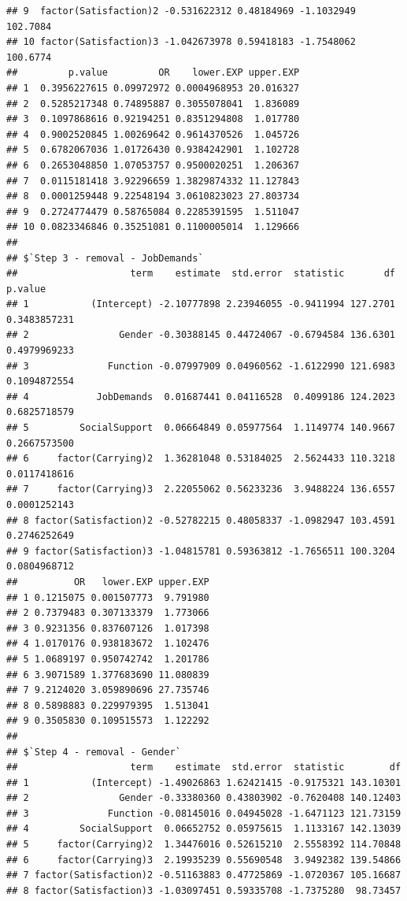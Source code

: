 \documentclass[
]{book}
\begin{document}
\begin{verbatim}
## 9  factor(Satisfaction)2 -0.531622312 0.48184969 -1.1032949 102.7084
## 10 factor(Satisfaction)3 -1.042673978 0.59418183 -1.7548062 100.6774
##         p.value         OR    lower.EXP upper.EXP
## 1  0.3956227615 0.09972972 0.0004968953 20.016327
## 2  0.5285217348 0.74895887 0.3055078041  1.836089
## 3  0.1097868616 0.92194251 0.8351294808  1.017780
## 4  0.9002520845 1.00269642 0.9614370526  1.045726
## 5  0.6782067036 1.01726430 0.9384242901  1.102728
## 6  0.2653048850 1.07053757 0.9500020251  1.206367
## 7  0.0115181418 3.92296659 1.3829874332 11.127843
## 8  0.0001259448 9.22548194 3.0610823023 27.803734
## 9  0.2724774479 0.58765084 0.2285391595  1.511047
## 10 0.0823346846 0.35251081 0.1100005014  1.129666
## 
## $`Step 3 - removal - JobDemands`
##                    term    estimate  std.error  statistic       df      p.value
## 1           (Intercept) -2.10777898 2.23946055 -0.9411994 127.2701 0.3483857231
## 2                Gender -0.30388145 0.44724067 -0.6794584 136.6301 0.4979969233
## 3              Function -0.07997909 0.04960562 -1.6122990 121.6983 0.1094872554
## 4            JobDemands  0.01687441 0.04116528  0.4099186 124.2023 0.6825718579
## 5         SocialSupport  0.06664849 0.05977564  1.1149774 140.9667 0.2667573500
## 6     factor(Carrying)2  1.36281048 0.53184025  2.5624433 110.3218 0.0117418616
## 7     factor(Carrying)3  2.22055062 0.56233236  3.9488224 136.6557 0.0001252143
## 8 factor(Satisfaction)2 -0.52782215 0.48058337 -1.0982947 103.4591 0.2746252649
## 9 factor(Satisfaction)3 -1.04815781 0.59363812 -1.7656511 100.3204 0.0804968712
##          OR   lower.EXP upper.EXP
## 1 0.1215075 0.001507773  9.791980
## 2 0.7379483 0.307133379  1.773066
## 3 0.9231356 0.837607126  1.017398
## 4 1.0170176 0.938183672  1.102476
## 5 1.0689197 0.950742742  1.201786
## 6 3.9071589 1.377683690 11.080839
## 7 9.2124020 3.059890696 27.735746
## 8 0.5898883 0.229979395  1.513041
## 9 0.3505830 0.109515573  1.122292
## 
## $`Step 4 - removal - Gender`
##                    term    estimate  std.error  statistic        df
## 1           (Intercept) -1.49026863 1.62421415 -0.9175321 143.10301
## 2                Gender -0.33380360 0.43803902 -0.7620408 140.12403
## 3              Function -0.08145016 0.04945028 -1.6471123 121.73159
## 4         SocialSupport  0.06652752 0.05975615  1.1133167 142.13039
## 5     factor(Carrying)2  1.34476016 0.52615210  2.5558392 114.70848
## 6     factor(Carrying)3  2.19935239 0.55690548  3.9492382 139.54866
## 7 factor(Satisfaction)2 -0.51163883 0.47725869 -1.0720367 105.16687
## 8 factor(Satisfaction)3 -1.03097451 0.59335708 -1.7375280  98.73457

\end{verbatim}
\end{document}
